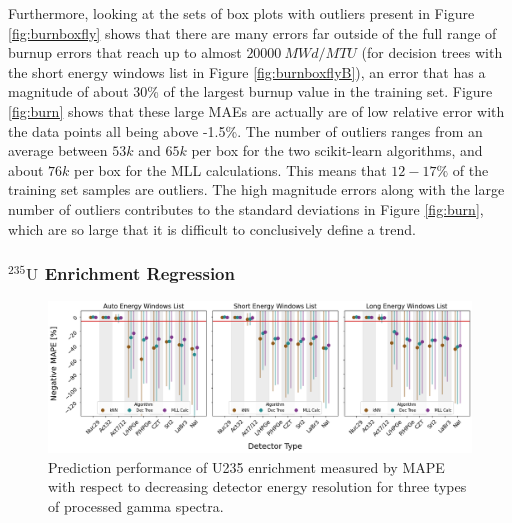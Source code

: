 Furthermore, looking at the sets of box plots with outliers present in Figure
\ref{fig:burnboxfly} shows that there are many errors far outside of the full
range of burnup errors that reach up to almost $20000\:MWd/MTU$ (for decision
trees with the short energy windows list in Figure \ref{fig:burnboxflyB}), an
error that has a magnitude of about 30\% of the largest burnup value in the
training set.  Figure \ref{fig:burn} shows that these large \gls{MAE}s are
actually are of low relative error with the data points all being above -1.5\%.
The number of outliers ranges from an average between $53k$ and $65k$ per box
for the two scikit-learn algorithms, and about $76k$ per box for the \gls{MLL}
calculations.  This means that $12-17\%$ of the training set samples are
outliers.  The high magnitude errors along with the large number of outliers
contributes to the standard deviations in Figure \ref{fig:burn}, which are so
large that it is difficult to conclusively define a trend.

\subsubsection{\texorpdfstring{${}^{235}\text{U}$}{U-235} Enrichment Regression}

\begin{figure}[!htb]
  \centering
  \includegraphics[width=\textwidth]{./chapters/exp2/detector_preds_wrt_enlist_MAPE_enri.png}
  \caption[Prediction performance of \acrshort{U235} regression with decreasing 
           detector energy resolution]
          {Prediction performance of \acrshort{U235} enrichment measured by 
           \acrshort{MAPE} with respect to decreasing detector energy resolution
           for three types of processed gamma spectra.}
  \label{fig:enri}
\end{figure}

